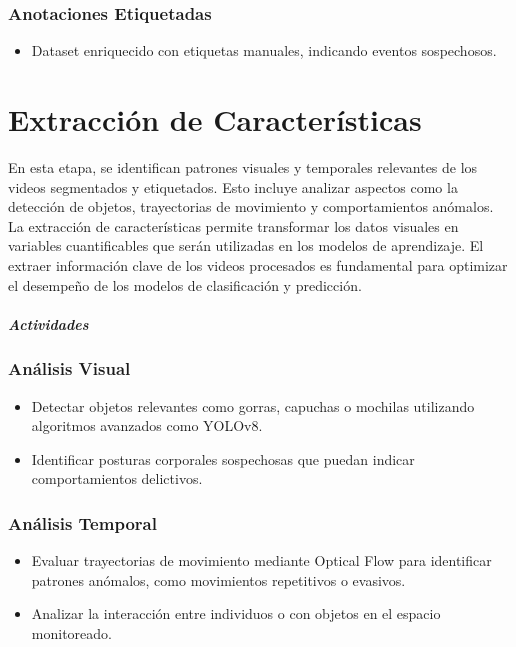\documentclass[listof=nochaptergap,12pt,times,authoryear]{report}
\begin{document}
\subsubsection{Anotaciones Etiquetadas}
\begin{itemize}
    \item Dataset enriquecido con etiquetas manuales, indicando eventos sospechosos.
\end{itemize}




\section{Extracción de Características}

En esta etapa, se identifican patrones visuales y temporales relevantes de los videos segmentados y etiquetados. Esto incluye analizar aspectos como la detección de objetos, trayectorias de movimiento y comportamientos anómalos. La extracción de características permite transformar los datos visuales en variables cuantificables que serán utilizadas en los modelos de aprendizaje.
El extraer información clave de los videos procesados es fundamental para optimizar el desempeño de los modelos de clasificación y predicción.


\paragraph{\textit{Actividades}}

\subsubsection{Análisis Visual}

\begin{itemize}
    \item Detectar objetos relevantes como gorras, capuchas o mochilas utilizando algoritmos avanzados como YOLOv8.
    \item Identificar posturas corporales sospechosas que puedan indicar comportamientos delictivos.
\end{itemize}


\subsubsection{Análisis Temporal}
\begin{itemize}
    \item Evaluar trayectorias de movimiento mediante Optical Flow para identificar patrones anómalos, como movimientos repetitivos o evasivos.
    \item Analizar la interacción entre individuos o con objetos en el espacio monitoreado.
\end{itemize}
\end{document}
